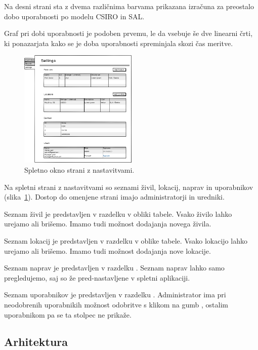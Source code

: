 \documentclass[a4paper, 12pt]{book}
\begin{document}
Na desni strani sta z dvema različnima barvama prikazana izračuna za preostalo dobo uporabnosti po modelu CSIRO in SAL.

Graf pri dobi uporabnosti je podoben prvemu, le da vsebuje še dve linearni črti, ki ponazarjata kako se je doba uporabnosti spreminjala skozi čas meritve.

\vspace{5mm}

\begin{figure}[h]
\begin{center}
\includegraphics[width=0.5\textwidth]{slike/Settings.png}
\end{center}
\caption{Spletno okno strani z nastavitvami.}
\label{settings-wireframe}
\end{figure}

Na spletni strani z nastavitvami so seznami živil, lokacij, naprav in uporabnikov (slika~\ref{settings-wireframe}). Dostop do omenjene strani imajo administratorji in uredniki. 

Seznam živil je predstavljen v razdelku  v obliki tabele. Vsako živilo lahko urejamo ali brišemo. Imamo tudi možnost dodajanja novega živila. 

Seznam lokacij je predstavljen v razdelku  v oblike tabele. Vsako lokacijo lahko urejamo ali brišemo. Imamo tudi možnost dodajanja nove lokacije.

Seznam naprav je predstavljen v razdelku . Seznam naprav lahko samo pregledujemo, saj so že pred-nastavljene v spletni aplikaciji.

Seznam uporabnikov je predstavljen v razdelku . 
Administrator ima pri neodobrenih uporabnikih možnost odobritve s klikom na gumb , ostalim uporabnikom pa se ta stolpec ne prikaže.



\subsection{Arhitektura}
\end{document}
